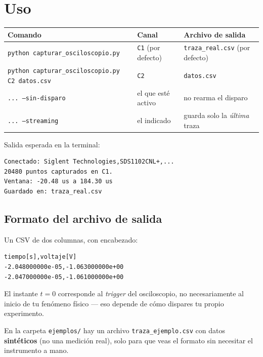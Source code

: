 \documentclass[11pt,a4paper]{article}
\begin{document}
\section{Uso}

\begin{center}
\begin{tabular}{@{}lll@{}}
\toprule
\textbf{Comando} & \textbf{Canal} & \textbf{Archivo de salida} \\
\midrule
\texttt{python capturar\_osciloscopio.py} & \texttt{C1} (por defecto) & \texttt{traza\_real.csv} (por defecto) \\
\texttt{python capturar\_osciloscopio.py C2 datos.csv} & \texttt{C2} & \texttt{datos.csv} \\
\texttt{... --sin-disparo} & el que esté activo & no rearma el disparo \\
\texttt{... --streaming} & el indicado & guarda solo la \emph{última} traza \\
\bottomrule
\end{tabular}
\end{center}

\vspace{0.4em}
Salida esperada en la terminal:
\begin{lstlisting}
Conectado: Siglent Technologies,SDS1102CNL+,...
20480 puntos capturados en C1.
Ventana: -20.48 us a 184.30 us
Guardado en: traza_real.csv
\end{lstlisting}

\subsection{Formato del archivo de salida}
Un CSV de dos columnas, con encabezado:
\begin{lstlisting}
tiempo[s],voltaje[V]
-2.048000000e-05,-1.063000000e+00
-2.047000000e-05,-1.061000000e+00
\end{lstlisting}
El instante $t=0$ corresponde al \emph{trigger} del osciloscopio, no
necesariamente al inicio de tu fenómeno físico --- eso depende de cómo
dispares tu propio experimento.

\begin{nota}[title=Dato de muestra]
En la carpeta \texttt{ejemplos/} hay un archivo \texttt{traza\_ejemplo.csv}
con datos \textbf{sintéticos} (no una medición real), solo para que veas el
formato sin necesitar el instrumento a mano.
\end{nota}
\end{document}
